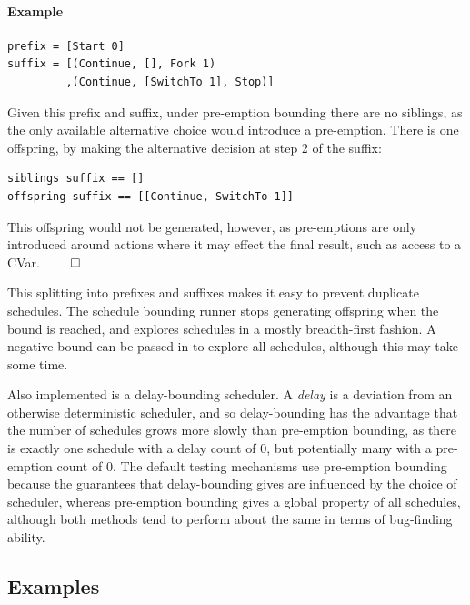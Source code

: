 \begin{justspacing}
\paragraph{Example}

\begin{verbatim}
prefix = [Start 0]
suffix = [(Continue, [], Fork 1)
         ,(Continue, [SwitchTo 1], Stop)]
\end{verbatim}

Given this prefix and suffix, under pre-emption bounding there are no
siblings, as the only available alternative choice would introduce a
pre-emption. There is one offspring, by making the alternative
decision at step 2 of the suffix:

\begin{verbatim}
siblings suffix == []
offspring suffix == [[Continue, SwitchTo 1]]
\end{verbatim}

This offspring would not be generated, however, as pre-emptions are
only introduced around actions where it may effect the final result,
such as access to a CVar. \hfill $\qed$
\end{justspacing}

This splitting into prefixes and suffixes makes it easy to prevent
duplicate schedules. The schedule bounding runner stops generating
offspring when the bound is reached, and explores schedules in a
mostly breadth-first fashion. A negative bound can be passed in to
explore all schedules, although this may take some time.

Also implemented is a delay-bounding scheduler. A \textit{delay} is a
deviation from an otherwise deterministic scheduler, and so
delay-bounding has the advantage that the number of schedules grows
more slowly than pre-emption bounding, as there is exactly one
schedule with a delay count of 0, but potentially many with a
pre-emption count of 0. The default testing mechanisms use pre-emption
bounding because the guarantees that delay-bounding gives are
influenced by the choice of scheduler, whereas pre-emption bounding
gives a global property of all schedules, although both methods tend
to perform about the same in terms of bug-finding
ability\cite{empirical}.

\subsection{Examples}
\label{sec:prelims-dejafu-example}

